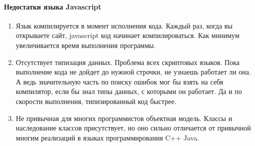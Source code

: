 \paragraph{Недостатки языка Javascript}
\begin{enumerate}
	\item Язык компилируется в момент исполнения кода. Каждый раз, когда вы открываете сайт, javascript код начинает компилироваться. Как минимум увеличивается время выполнения программы.
	\item Отсутствует типизация данных. Проблема всех скриптовых языков. Пока выполнение кода не дойдет до нужной строчки, не узнаешь работает ли она. А ведь значительную часть по поиску ошибок мог бы взять на себя компилятор, если бы знал типы данных, с которыми он работает. Да и по скорости выполнения, типизированный код быстрее.
	\item Не привычная для многих программистов объектная модель. Классы и наследование классов присутствует, но оно сильно отличается от привычной многим реализаций в языках программирования C++ Java.
\end{enumerate}